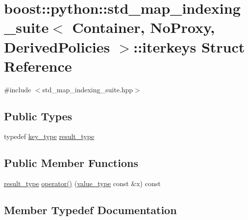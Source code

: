 \hypertarget{structboost_1_1python_1_1std__map__indexing__suite_1_1iterkeys}{}\section{boost\+:\+:python\+:\+:std\+\_\+map\+\_\+indexing\+\_\+suite$<$ Container, No\+Proxy, Derived\+Policies $>$\+:\+:iterkeys Struct Reference}
\label{structboost_1_1python_1_1std__map__indexing__suite_1_1iterkeys}


{\ttfamily \#include $<$std\+\_\+map\+\_\+indexing\+\_\+suite.\+hpp$>$}

\subsection*{Public Types}
\begin{DoxyCompactItemize}
\item 
typedef \hyperlink{classboost_1_1python_1_1std__map__indexing__suite_a4e2daeb60a58d6ce9964e0ea27680009}{key\+\_\+type} \hyperlink{structboost_1_1python_1_1std__map__indexing__suite_1_1iterkeys_a7c12b5aeae081d2ecf524e29e5a5c343}{result\+\_\+type}
\end{DoxyCompactItemize}
\subsection*{Public Member Functions}
\begin{DoxyCompactItemize}
\item 
\hyperlink{structboost_1_1python_1_1std__map__indexing__suite_1_1iterkeys_a7c12b5aeae081d2ecf524e29e5a5c343}{result\+\_\+type} \hyperlink{structboost_1_1python_1_1std__map__indexing__suite_1_1iterkeys_a0e3b853fc4bbcc4777e5c663cc8bdd60}{operator()} (\hyperlink{classboost_1_1python_1_1std__map__indexing__suite_aff9ed68cf30e805a04a313d92c62ab38}{value\+\_\+type} const \&x) const 
\end{DoxyCompactItemize}


\subsection{Member Typedef Documentation}
